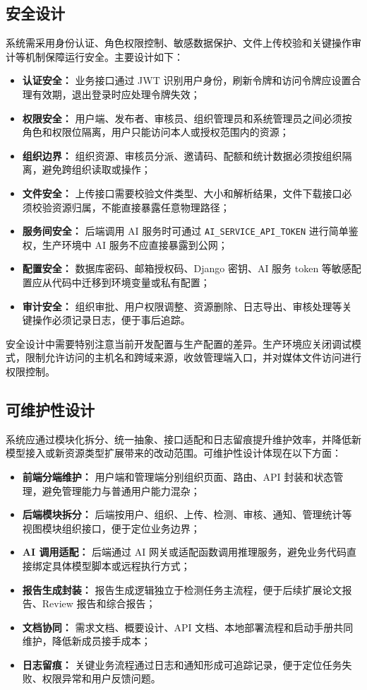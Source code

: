 \subsection{安全设计}
系统需采用身份认证、角色权限控制、敏感数据保护、文件上传校验和关键操作审计等机制保障运行安全。主要设计如下：
\begin{itemize}[leftmargin=2em]
    \item \textbf{认证安全：} 业务接口通过 JWT 识别用户身份，刷新令牌和访问令牌应设置合理有效期，退出登录时应处理令牌失效；
    \item \textbf{权限安全：} 用户端、发布者、审核员、组织管理员和系统管理员之间必须按角色和权限位隔离，用户只能访问本人或授权范围内的资源；
    \item \textbf{组织边界：} 组织资源、审核员分派、邀请码、配额和统计数据必须按组织隔离，避免跨组织读取或操作；
    \item \textbf{文件安全：} 上传接口需要校验文件类型、大小和解析结果，文件下载接口必须校验资源归属，不能直接暴露任意物理路径；
    \item \textbf{服务间安全：} 后端调用 AI 服务时可通过 \texttt{AI\_SERVICE\_API\_TOKEN} 进行简单鉴权，生产环境中 AI 服务不应直接暴露到公网；
    \item \textbf{配置安全：} 数据库密码、邮箱授权码、Django 密钥、AI 服务 token 等敏感配置应从代码中迁移到环境变量或私有配置；
    \item \textbf{审计安全：} 组织审批、用户权限调整、资源删除、日志导出、审核处理等关键操作必须记录日志，便于事后追踪。
\end{itemize}

安全设计中需要特别注意当前开发配置与生产配置的差异。生产环境应关闭调试模式，限制允许访问的主机名和跨域来源，收敛管理端入口，并对媒体文件访问进行权限控制。

\subsection{可维护性设计}
系统应通过模块化拆分、统一抽象、接口适配和日志留痕提升维护效率，并降低新模型接入或新资源类型扩展带来的改动范围。可维护性设计体现在以下方面：
\begin{itemize}[leftmargin=2em]
    \item \textbf{前端分端维护：} 用户端和管理端分别组织页面、路由、API 封装和状态管理，避免管理能力与普通用户能力混杂；
    \item \textbf{后端模块拆分：} 后端按用户、组织、上传、检测、审核、通知、管理统计等视图模块组织接口，便于定位业务边界；
    \item \textbf{AI 调用适配：} 后端通过 AI 网关或适配函数调用推理服务，避免业务代码直接绑定具体模型脚本或远程执行方式；
    \item \textbf{报告生成封装：} 报告生成逻辑独立于检测任务主流程，便于后续扩展论文报告、Review 报告和综合报告；
    \item \textbf{文档协同：} 需求文档、概要设计、API 文档、本地部署流程和启动手册共同维护，降低新成员接手成本；
    \item \textbf{日志留痕：} 关键业务流程通过日志和通知形成可追踪记录，便于定位任务失败、权限异常和用户反馈问题。
\end{itemize}

